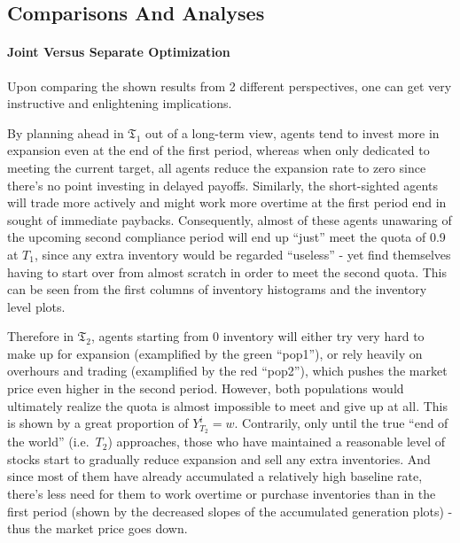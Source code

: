 \documentclass[a4paper,10pt]{article}
\newcommand{\1}{\mathbf{1}}
\begin{document}
\newpage  %

\subsection{Comparisons And Analyses}

\paragraph{Joint Versus Separate Optimization}

Upon comparing the shown results from 2 different perspectives, one can
get very instructive and enlightening implications.

By planning ahead in \(\mathfrak{T}_1\) out of a long-term view,
agents tend to invest more in expansion even at the end of the first
period, whereas when only dedicated to meeting the current target, all
agents reduce the expansion rate to zero since there's no point
investing in delayed payoffs. Similarly, the short-sighted agents will
trade more actively and might work more overtime at the first period end
in sought of immediate paybacks. Consequently, almost of these agents
unawaring of the upcoming second compliance period will end up ``just''
meet the quota of 0.9 at \(T_1\), since any extra inventory would be
regarded ``useless'' - yet find themselves having to start over from
almost scratch in order to meet the second quota. This can be seen from
the first columns of inventory histograms and the inventory level plots.

Therefore in \(\mathfrak{T}_2\), agents starting from 0
inventory will either try very hard to make up for expansion
(examplified by the green ``pop1''), or rely heavily on overhours and
trading (examplified by the red ``pop2''), which pushes the market price
even higher in the second period. However, both populations would
ultimately realize the quota is almost impossible to meet and give up at
all. This is shown by a great proportion of \(Y_{T_2}^i=w\). Contrarily,
only until the true ``end of the world'' (i.e.~\(T_2\)) approaches,
those who have maintained a reasonable level of stocks start to
gradually reduce expansion and sell any extra inventories. And since
most of them have already accumulated a relatively high baseline rate,
there's less need for them to work overtime or purchase inventories than
in the first period (shown by the decreased slopes of the accumulated
generation plots) - thus the market price goes down.
\end{document}

